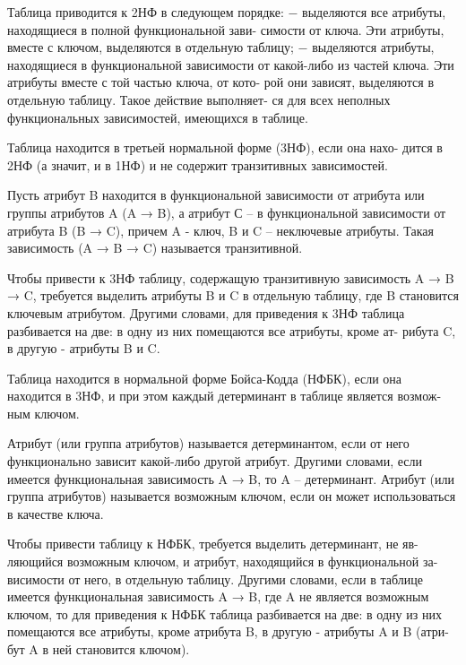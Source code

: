 Таблица приводится к 2НФ в следующем порядке:
− выделяются все атрибуты, находящиеся в полной функциональной зави-
симости от ключа. Эти атрибуты, вместе с ключом, выделяются в отдельную
таблицу;
− выделяются атрибуты, находящиеся в функциональной зависимости от
какой-либо из частей ключа. Эти атрибуты вместе с той частью ключа, от кото-
рой они зависят, выделяются в отдельную таблицу. Такое действие выполняет-
ся для всех неполных функциональных зависимостей, имеющихся в таблице.

Таблица находится в третьей нормальной форме (3НФ), если она нахо-
дится в 2НФ (а значит, и в 1НФ) и не содержит транзитивных зависимостей.

Пусть атрибут B находится в функциональной зависимости от атрибута
или группы атрибутов A (A → B), а атрибут С – в функциональной зависимости
от атрибута B (B → C), причем A - ключ, B и C – неключевые атрибуты. Такая
зависимость (A → B → C) называется транзитивной.

Чтобы привести к 3НФ таблицу, содержащую транзитивную зависимость
A → B → C, требуется выделить атрибуты B и C в отдельную таблицу, где B
становится ключевым атрибутом. Другими словами, для приведения к 3НФ
таблица разбивается на две: в одну из них помещаются все атрибуты, кроме ат-
рибута C, в другую - атрибуты B и C.

Таблица находится в нормальной форме Бойса-Кодда (НФБК), если она
находится в 3НФ, и при этом каждый детерминант в таблице является возмож-
ным ключом.

Атрибут (или группа атрибутов) называется детерминантом, если от него
функционально зависит какой-либо другой атрибут. Другими словами, если
имеется функциональная зависимость A → B, то A – детерминант.
Атрибут (или группа атрибутов) называется возможным ключом, если он
может использоваться в качестве ключа.

Чтобы привести таблицу к НФБК, требуется выделить детерминант, не яв-
ляющийся возможным ключом, и атрибут, находящийся в функциональной за-
висимости от него, в отдельную таблицу. Другими словами, если в таблице
имеется функциональная зависимость A → B, где A не является возможным
ключом, то для приведения к НФБК таблица разбивается на две: в одну из них
помещаются все атрибуты, кроме атрибута B, в другую - атрибуты A и B (атри-
бут A в ней становится ключом).

